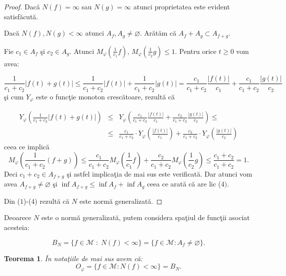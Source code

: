 \documentclass[ a4paper, 12pt]{report}
\newtheorem{theorem}{\bf Teorema}[section]
\theoremstyle{definition}
\theoremstyle{remark}
\numberwithin{equation}{section}
\begin{document}
\begin{proof}
Dac\u a $N(f) = \infty$ sau $N(g) = \infty$ atunci proprietatea este evident satisf\u acut\u a.

Dac\u a $N(f),N(g)<\infty$ atunci $A_f,A_g \neq \varnothing$. Ar\u at\u am c\u a $A_f + A_g \subset A_{f+g}$.

Fie $c_1 \in A_f$ \c si $c_2 \in A_g$. Atunci $M_\varphi\left(\frac{1}{c_1}f \right), \,  M_\varphi\left(\frac{1}{c_2}g \right) \leq 1$. Pentru orice  $t\geq 0$ vom avea:

$$\frac{1}{c_1+c_2}\lvert f(t)+g(t) \rvert \leq \frac{1}{c_1+c_2}\lvert f(t) \rvert + \frac{1}{c_1+c_2} \lvert g(t) \rvert = \frac{c_1}{c_1+c_2} \frac{\lvert f(t) \rvert}{c_1} + \frac{c_1}{c_1+c_2} \frac{\lvert g(t) \rvert}{c_2}$$
\c si cum $Y_\varphi$ este o func\c tie monoton cresc\u atoare, rezult\u a c\u a


\begin{eqnarray*}
Y_\varphi \left (\frac{1}{c_1+c_2}\lvert f(t)+g(t) \rvert \right ) &\leq& Y_\varphi \left (\frac{c_1}{c_1+c_2} \frac{\lvert f(t) \rvert}{c_1} + \frac{c_2}{c_1+c_2} \frac{\lvert g(t) \rvert}{c_2}\right ) \leq \\
&\leq&\frac{c_1}{c_1+c_2} \cdot Y_\varphi \left (\frac{\lvert f(t) \rvert}{c_1}\right ) +  \frac{c_2}{c_1+c_2} \cdot Y_\varphi \left (\frac{\lvert g(t) \rvert}{c_2}\right )
 \end{eqnarray*}
 ceea ce implic\u a
$$M_\varphi \left (\frac{1}{c_1+c_2}(f+g)\right ) \leq \frac{c_1}{c_1+c_2} M_\varphi \left (\frac{1}{c_1}f\right )+ \frac{c_2}{c_1+c_2} M_\varphi \left (\frac{1}{c_2}g\right )\leq \frac{c_1+c_2}{c_1+c_2}=1.$$ Deci $c_1+c_2 \in A_{f+g}$ \c si astfel implica\c tia de mai sus este verificat\u a. Dar atunci vom avea $A_{f+g} \neq \varnothing$ \c si $\inf A_{f+g} \leq \inf A_f + \inf A_g$ ceea ce arat\u a c\u a are lic ($4)$.

\smallskip

Din ($1$)-($4$) rezult\u a c\u a $ N$ este norm\u a generalizat\u a.
\end{proof}

\medskip

Deoarece $N$ este o norm\u a generalizat\u a, putem considera spa\c tiul de func\c tii asociat acesteia:

$$B_N = \{ f \in \mathcal{M}\; : \; N(f) < \infty\} = \{f \in \mathcal{M}: A_f \neq \varnothing\}.$$

\begin{theorem} \^ In nota\c tiile de mai sus avem c\u a:
$$O_\varphi =\{ f \in \mathcal{M}: N(f) < \infty\} = B_N.$$
\end{theorem}
\end{document}
